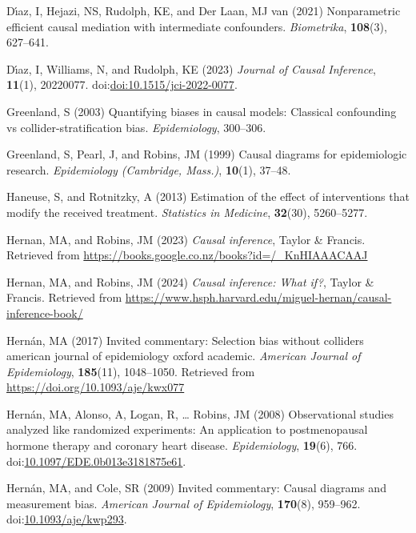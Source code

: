 \documentclass[
  single column]{article}
\newlength{\cslhangindent}
\newenvironment{CSLReferences}[2] %
 {\begin{list}{}{%
  \setlength{\itemindent}{0pt}
  \setlength{\leftmargin}{0pt}
  \setlength{\parsep}{0pt}
  \ifodd #1
   \setlength{\leftmargin}{\cslhangindent}
   \setlength{\itemindent}{-1\cslhangindent}
  \fi
  \setlength{\itemsep}{#2\baselineskip}}}
 {\end{list}}
\begin{document}
\begin{CSLReferences}{1}{0}
Dı́az, I, Hejazi, NS, Rudolph, KE, and Der Laan, MJ van (2021)
Nonparametric efficient causal mediation with intermediate confounders.
\emph{Biometrika}, \textbf{108}(3), 627--641.

Dı́az, I, Williams, N, and Rudolph, KE (2023) \emph{Journal of Causal
Inference}, \textbf{11}(1), 20220077.
doi:\href{https://doi.org/doi:10.1515/jci-2022-0077}{doi:10.1515/jci-2022-0077}.

Greenland, S (2003) Quantifying biases in causal models: Classical
confounding vs collider-stratification bias. \emph{Epidemiology},
300--306.

Greenland, S, Pearl, J, and Robins, JM (1999) Causal diagrams for
epidemiologic research. \emph{Epidemiology (Cambridge, Mass.)},
\textbf{10}(1), 37--48.

Haneuse, S, and Rotnitzky, A (2013) Estimation of the effect of
interventions that modify the received treatment. \emph{Statistics in
Medicine}, \textbf{32}(30), 5260--5277.

Hernan, MA, and Robins, JM (2023) \emph{Causal inference}, Taylor \&
Francis. Retrieved from
\url{https://books.google.co.nz/books?id=/_KnHIAAACAAJ}

Hernan, MA, and Robins, JM (2024) \emph{Causal inference: What if?},
Taylor \& Francis. Retrieved from
\url{https://www.hsph.harvard.edu/miguel-hernan/causal-inference-book/}

Hernán, MA (2017) Invited commentary: Selection bias without colliders
\textbar{} american journal of epidemiology \textbar{} oxford academic.
\emph{American Journal of Epidemiology}, \textbf{185}(11), 1048--1050.
Retrieved from \url{https://doi.org/10.1093/aje/kwx077}

Hernán, MA, Alonso, A, Logan, R, \ldots{} Robins, JM (2008)
Observational studies analyzed like randomized experiments: An
application to postmenopausal hormone therapy and coronary heart
disease. \emph{Epidemiology}, \textbf{19}(6), 766.
doi:\href{https://doi.org/10.1097/EDE.0b013e3181875e61}{10.1097/EDE.0b013e3181875e61}.

Hernán, MA, and Cole, SR (2009) Invited commentary: Causal diagrams and
measurement bias. \emph{American Journal of Epidemiology},
\textbf{170}(8), 959--962.
doi:\href{https://doi.org/10.1093/aje/kwp293}{10.1093/aje/kwp293}.


\end{CSLReferences}
\end{document}

